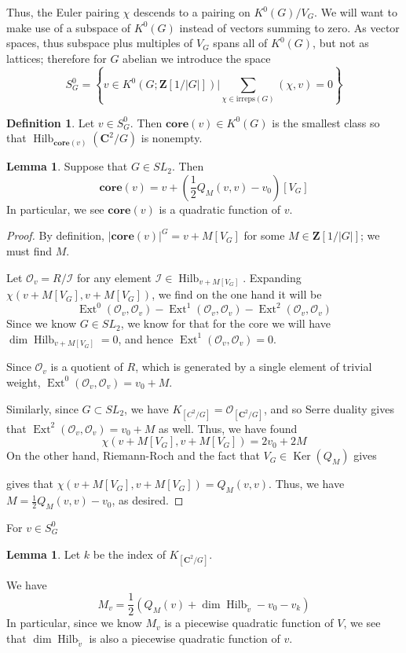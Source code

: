 \documentclass{amsart}[12pt]
\theoremstyle{definition}
\newtheorem{lemma}[dummy]{Lemma}
\newtheorem{definition}[dummy]{Definition}
\newcommand{\Z}{\mathbf{Z}}
\newcommand{\C}{\mathbf{C}}
\newcommand{\OO}{\mathcal{O}}
\newcommand{\core}{\mathbf{core}}
\newcommand{\irreps}{\text{irreps}}
\DeclareMathOperator{\Hilb}{Hilb}
\DeclareMathOperator{\Ext}{Ext}
\DeclareMathOperator{\Ker}{Ker}
\begin{document}
Thus, the Euler pairing $\chi$ descends to a pairing on $K^0(G)/V_G$.  We will want to make use of a subspace of $K^0(G)$ instead of vectors summing to zero.  As vector spaces, thus subspace plus multiples of $V_G$ spans all of $K^0(G)$, but not as lattices; therefore for $G$ abelian we introduce the space 
$$S^0_G=\left\{v\in K^0(G; \Z[1/|G|])\Bigg | \sum_{\chi\in\irreps(G)}(\chi, v)=0\right\}$$

\begin{definition}
Let $v\in S^0_G$.  Then $\core(v)\in K^0(G)$ is the smallest class so that $\Hilb_{\core(v)}(\C^2/G)$ is nonempty.
\end{definition}


\begin{lemma} Suppose that $G\in SL_2$. Then
$$\core(v)=v+(\frac{1}{2}Q_M(v,v)-v_0)[V_G]$$
In particular, we see $\core(v)$ is a quadratic function of $v$.
\end{lemma}

\begin{proof}
By definition, $|\core(v)|^G=v+M[V_G]$ for some $M\in\Z[1/|G|]$; we must find $M$.

Let $\OO_v=R/\mathcal{I}$ for any element $\mathcal{I}\in\Hilb_{v+M[V_G]}$.  Expanding $\chi(v+M[V_G], v+M[V_G])$, we find on the one hand it will be
$$\Ext^0(\OO_v,\OO_v)-\Ext^1(\OO_v,\OO_v)-\Ext^2(\OO_v,\OO_v)$$
Since we know $G\in SL_2$, we know for that for the core we will have $\dim\Hilb_{v+M[V_G]}=0$, and hence $\Ext^1(\OO_v,\OO_v)=0$.

Since $\OO_v$ is a quotient of $R$, which is generated by a single element of trivial weight, $\Ext^0(\OO_v,\OO_v)=v_0+M$.

Similarly, since $G\subset SL_2$, we have $K_{[C^2/G]}=\OO_{[\C^2/G]}$, and so Serre duality gives that $\Ext^2(\OO_v,\OO_v)=v_0+M$ as well.  Thus, we have found
$$\chi(v+M[V_G],v+M[V_G])=2v_0+2M$$
On the other hand, Riemann-Roch and the fact that $V_G\in\Ker(Q_{M})$ gives

gives that $\chi(v+M[V_G],v+M[V_G])=Q_M(v,v)$.  Thus, we have $M=\frac{1}{2}Q_M(v,v)-v_0$, as desired.
\end{proof}

For $v\in S^0_G$

\begin{lemma}
Let $k$ be the index of $K_{[\C^2/G]}$.

We have
$$M_v=\frac{1}{2}\left(Q_M(v)+\dim\Hilb_{\tilde{v}} -v_0-v_k\right)$$
In particular, since we know $M_v$ is a piecewise quadratic function of $V$, we see that $\dim\Hilb_{\tilde{v}}$ is also a piecewise quadratic function of $v$.

\end{lemma}
\end{document}
